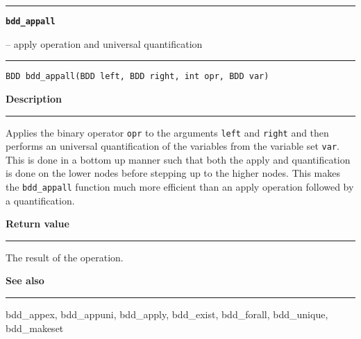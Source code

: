 \begin{minipage}{\textwidth}

\noindent\begin{minipage}{\textwidth}
\rule{\textwidth}{0.5mm}
{\tt\bf bdd\_appall }
\--- apply operation and universal quantification  \hspace{\fill}
\\\rule[1.5ex]{\textwidth}{0.5mm}
\end{minipage}

\noindent\begin{verbatim}
BDD bdd_appall(BDD left, BDD right, int opr, BDD var) 
\end{verbatim}

\vspace{\parsep}\noindent
{\bf Description}\\\rule[1.5ex]{\textwidth}{0.2mm}\vspace{-1.5ex}\setlength{\parindent}{1em}
Applies the binary operator {\tt opr} to the arguments
           {\tt left} and {\tt right} and then performs an universal
	   quantification of the variables from the variable set
	   {\tt var}. This is done in a bottom up manner such that both the
	   apply and quantification is done on the lower nodes before
	   stepping up to the higher nodes. This makes the {\tt bdd\_appall}
	   function much more efficient than an apply operation followed
	   by a quantification. 

\setlength{\parindent}{0em}\vspace{\parsep}\vspace{\baselineskip}\noindent
{\bf Return value}\\\rule[1.5ex]{\textwidth}{0.2mm}\vspace{-1.5ex}
The result of the operation. 

\vspace{\parsep}\vspace{\baselineskip}\noindent
{\bf See also}\\\rule[1.5ex]{\textwidth}{0.2mm}\vspace{-1.5ex}
bdd\_appex, bdd\_appuni, bdd\_apply, bdd\_exist, bdd\_forall, bdd\_unique, bdd\_makeset 
\end{minipage}
\vspace{8ex}
